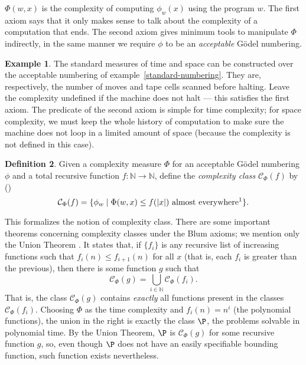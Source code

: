 \documentclass[12pt]{article}
\theoremstyle{definition}
\newtheorem{definition}{Definition}
\newtheorem{example}[definition]{Example}
\begin{document}
$\Phi(w, x)$ is the complexity of computing $\phi_w(x)$
using the program $w$.
The first axiom says that it only makes sense
to talk about the complexity of a computation that ends.
The second axiom gives minimum tools to manipulate $\Phi$ indirectly,
in the same manner we require $\phi$ to be an \emph{acceptable} Gödel numbering.

\vspace{12pt}
\begin{example}
    The standard measures of time and space can be constructed
    over the acceptable numbering of example~\ref{standard-numbering}.
    They are, respectively,
    the number of moves and tape cells scanned
    before halting.
    Leave the complexity undefined if the machine does not halt
    --- this satisfies the first axiom.
    The predicate of the second axiom is simple for time complexity;
    for space complexity,
    we must keep the whole history of computation
    to make sure the machine does not loop in a limited amount of space
    (because the complexity is not defined in this case).
\end{example}

\vspace{12pt}
\begin{definition}
    Given a complexity measure $\Phi$ for an acceptable Gödel numbering $\phi$
    and a total recursive function $f : \mathbb N \to \mathbb N$,
    define the \emph{complexity class} $\mathcal C_\Phi(f)$ by
    (\cite[p.~232]{Kozen2006})
    \begin{equation*}
        \mathcal C_\Phi(f) = \{
            \phi_w \mid \Phi(w, x) \leq f(|x|)\ \text{almost everywhere\footnotemark}
        \}.
    \end{equation*}
\end{definition}

This formalizes the notion of complexity class.
There are some important theorems concerning complexity classes
under the Blum axioms;
we mention only the Union Theorem \cite[p.~234]{Kozen2006}.
It states that,
if $\{f_i\}$ is any recursive list of increasing functions
such that $f_i(n) \leq f_{i+1}(n)$ for all $x$
(that is, each $f_i$ is greater than the previous),
then there is some function $g$ such that
\begin{equation*}
    \mathcal C_\Phi(g) = \bigcup_{i \in \mathbb N} \mathcal C_\Phi(f_i).
\end{equation*}
That is, the class $\mathcal C_\Phi(g)$ contains \emph{exactly}
all functions present in the classes $\mathcal C_\Phi(f_i)$.
Choosing $\Phi$ as the time complexity and $f_i(n) = n^i$
(the polynomial functions),
the union in the right is exactly the class $\P$,
the problems solvable in polynomial time.
By the Union Theorem, $\P$ is $\mathcal C_\Phi(g)$
for some recursive function $g$,
so, even though $\P$ does not have an easily specifiable bounding function,
such function exists nevertheless.
\end{document}
